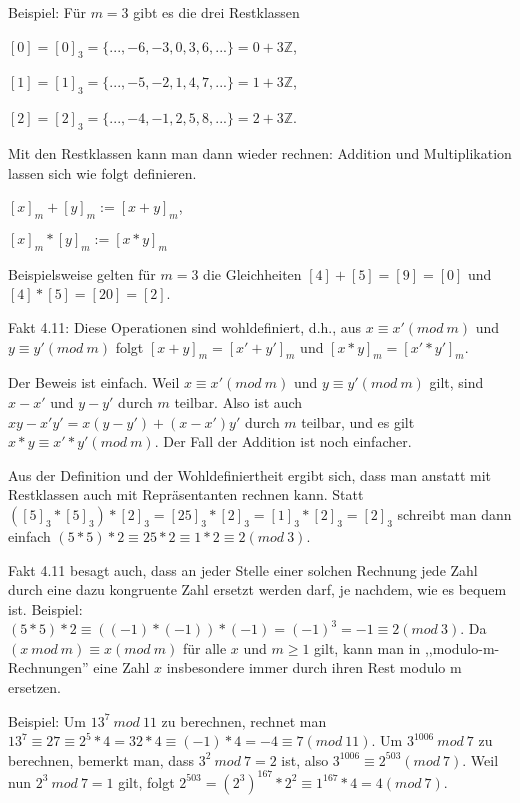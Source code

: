\documentclass[a4paper]{article}
\begin{document}
\begin{multicols}{3}
    Beispiel: Für $m=3$ gibt es die drei Restklassen
    \begin{itemize*}
        \item $[0] = [0]_3 =\{...,-6,-3,0,3,6,...\}= 0 + 3\mathbb{Z}$,
        \item $[1] = [1]_3 =\{...,-5,-2,1,4,7,...\}= 1 + 3\mathbb{Z}$,
        \item $[2] = [2]_3 =\{...,-4,-1,2,5,8,...\}= 2 + 3\mathbb{Z}$.
    \end{itemize*}

    Mit den Restklassen kann man dann wieder rechnen: Addition und Multiplikation lassen sich wie folgt definieren.
    \begin{itemize*}
        \item $[x]_m+ [y]_m := [x+y]_m$,
        \item $[x]_m*[y]_m := [x*y]_m$
    \end{itemize*}

    Beispielsweise gelten für $m=3$ die Gleichheiten $[4] + [5] = [9] = [0]$ und $[4]*[5] =[20] = [2]$.

    Fakt 4.11: Diese Operationen sind wohldefiniert, d.h., aus $x\equiv x'(mod\ m)$ und $y\equiv y'(mod\ m)$ folgt $[x+y]_m= [x'+y']_m$ und $[x*y]_m= [x'*y']_m$.

    Der Beweis ist einfach. Weil $x\equiv x' (mod\ m)$ und $y\equiv y' (mod\ m)$ gilt, sind $x-x'$ und $y-y'$ durch $m$ teilbar. Also ist auch $xy-x'y'=x(y-y') + (x-x')y'$ durch $m$ teilbar, und es gilt $x*y\equiv x'*y' (mod\ m)$. Der Fall der Addition ist noch einfacher.

    Aus der Definition und der Wohldefiniertheit ergibt sich, dass man anstatt mit Restklassen auch mit Repräsentanten rechnen kann. Statt $([5]_3 *[5]_3)*[2]_3 = [25]_3 *[2]_3 = [1]_3 *[2]_3 = [2]_3$ schreibt man dann einfach $(5*5)* 2 \equiv  25 * 2 \equiv  1 * 2 \equiv 2 (mod\ 3)$.

    Fakt 4.11 besagt auch, dass an jeder Stelle einer solchen Rechnung jede Zahl durch eine dazu kongruente Zahl ersetzt werden darf, je nachdem, wie es bequem ist. Beispiel: $(5*5)* 2 \equiv((-1)*(-1))*(-1) = (-1)^3 =- 1 \equiv 2 (mod\ 3)$. Da $(x\ mod\ m)\equiv x(mod\ m)$ für alle $x$ und $m\geq 1$ gilt, kann man in ,,modulo-m-Rechnungen'' eine Zahl $x$ insbesondere immer durch ihren Rest modulo m ersetzen.

    Beispiel: Um $13^7\ mod\ 11$ zu berechnen, rechnet man $13^7\equiv 27\equiv 2^5*4 =32* 4\equiv (-1)*4 = -4\equiv 7(mod\ 11)$. Um $3^{1006}\ mod\ 7$ zu berechnen, bemerkt man, dass $3^2\ mod\ 7=2$ ist, also $3^{1006}\equiv 2^{503}(mod\ 7)$. Weil nun $2^3\ mod\ 7=1$ gilt, folgt $2^{503}=(2^3)^{167} * 2^2 \equiv  1^{167}*4=4(mod\ 7)$.


\end{multicols}
\end{document}
